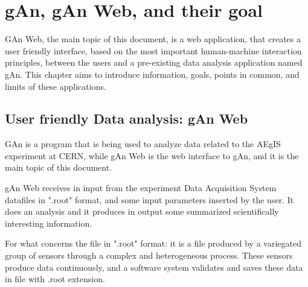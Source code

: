 
\chapter{gAn, gAn Web, and their goal} %

\label{Chapter2} %


GAn Web, the main topic of this document, is a web application, that creates a user friendly interface, based on the most important human-machine interaction principles, between the users and a pre-existing data analysis application named gAn. This chapter aims to introduce information, goals, points in common, and limits of these applications.

\section{User friendly Data analysis: gAn Web}

GAn is a program that is being used to analyze data related to the AEgIS experiment at CERN, while gAn Web is the web interface to gAn, and it is the main topic of this document.
 
gAn Web receives in input from the experiment Data Acquisition System datafiles in ".root" format, and some input parameters inserted by the user.
It does an analysis and it produces in output some summarized scientifically interesting information.   

For what concerns the file in ".root" format:
it is a file produced by a variegated group of sensors through a complex and heterogeneous process. These sensors produce data continuously, and a software system validates and saves these data in file with .root extension. 

